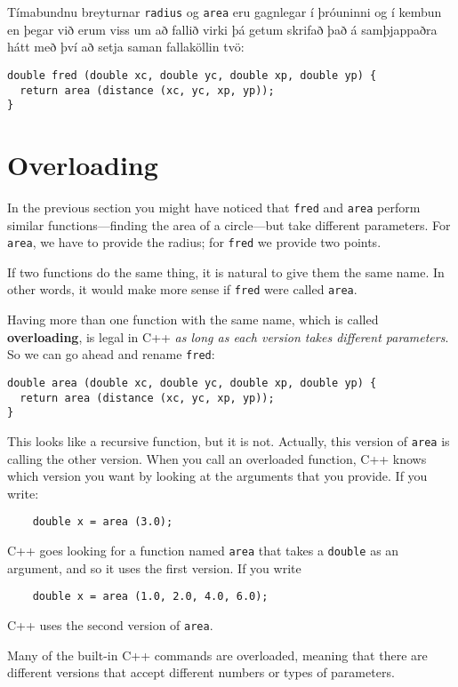 Tímabundnu breyturnar {\tt radius} og {\tt area} eru gagnlegar í þróuninni og í kembun 
en þegar við erum viss um að fallið virki þá getum skrifað það á samþjappaðra hátt með því að setja saman fallaköllin tvö:

\begin{verbatim}
double fred (double xc, double yc, double xp, double yp) {
  return area (distance (xc, yc, xp, yp));
} 
\end{verbatim}

\section{Overloading}
\label{overloading}

In the previous section you might have noticed that {\tt fred}
and {\tt area} perform similar functions---finding
the area of a circle---but take different parameters.  For
{\tt area}, we have to provide the radius; for {\tt fred}
we provide two points.

If two functions do the same thing, it is natural to give them
the same name.  In other words, it would make more sense if
{\tt fred} were called {\tt area}.

Having more than one function with the same name, which is called {\bf
overloading}, is legal in C++ {\em as long as each version takes
different parameters}.  So we can go ahead and rename {\tt fred}:

\begin{verbatim}
double area (double xc, double yc, double xp, double yp) {
  return area (distance (xc, yc, xp, yp));
} 
\end{verbatim}
%
This looks like a recursive function, but it is not.  Actually,
this version of {\tt area} is calling the other version.
When you call an overloaded function, C++ knows which version you
want by looking at the arguments that you provide.  If you write:

\begin{verbatim}
    double x = area (3.0);
\end{verbatim}
%
C++ goes looking for a function named {\tt area} that
takes a {\tt double} as an argument, and so it uses the
first version.  If you write

\begin{verbatim}
    double x = area (1.0, 2.0, 4.0, 6.0);
\end{verbatim}
%
C++ uses the second version of {\tt area}.  

Many of the built-in C++ commands are overloaded, meaning that there
are different versions that accept different numbers or types of
parameters.

